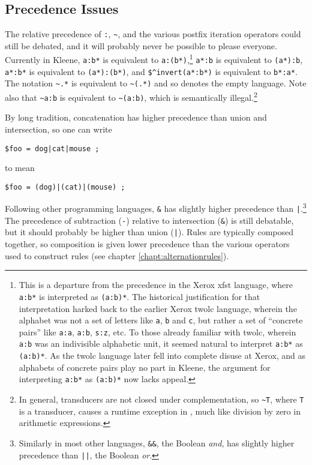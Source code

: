 \subsection{Precedence Issues}
 
The relative precedence of  \verb!:!, \verb!~!, and the various postfix
iteration operators could still be debated, and it will probably never be
possible to please everyone.
Currently in Kleene, 
\verb!a:b*!  is equivalent to \verb!a:(b*)!,\footnote{This is a
departure from the precedence in the Xerox xfst language, where
\verb!a:b*! is interpreted as \verb!(a:b)*!.  The historical
justification for that interpretation harked back to the earlier Xerox twolc
language, wherein the alphabet was not a set of letters like \verb!a!,
\verb!b! and \verb!c!, but rather a set of ``concrete pairs'' like
\verb!a:a!, \verb!a:b!, \verb!s:z!, etc. To those already familiar with
twolc, wherein \verb!a:b! was an indivisible alphabetic unit, it seemed
natural to interpret \verb!a:b*! as \verb!(a:b)*!. As the twolc language
later fell into complete disuse at Xerox, and as alphabets of concrete
pairs play no part in Kleene, the argument for interpreting
\verb!a:b*! as \verb!(a:b)*! now lacks appeal.}
\verb!a*:b!  is equivalent to \verb!(a*):b!,
\verb!a*:b*! is equivalent to \verb!(a*):(b*)!,
and
\verb!$^invert(a*:b*)! is equivalent to \verb!b*:a*!.
The notation \verb!~.*! is
equivalent to \verb!~(.*)! and so denotes the empty language.
Note also that \verb!~a:b! is
equivalent to \verb!~(a:b)!, which is semantically illegal.\footnote{In
	general, transducers are not closed under complementation, so
	\texttt{\~{}T}, where \texttt{T} is a transducer, causes a runtime
exception in \Kleene{}, much like division by zero in arithmetic
expressions.}

By long tradition, concatenation has higher precedence
than union and intersection, so one can write  

\begin{Verbatim}
$foo = dog|cat|mouse ; 
\end{Verbatim}

\noindent
to mean

\begin{Verbatim}
$foo = (dog)|(cat)|(mouse) ;
\end{Verbatim}

\noindent
Following other programming languages, \verb!&! has slightly higher
precedence than \verb!|!.\footnote{Similarly in most other languages,
\texttt{\&\&}, the Boolean \emph{and},
has slightly higher precedence than \texttt{||}, the Boolean \emph{or}.}
The precedence of subtraction (\verb!-!) relative to intersection
(\verb!&!) is still debatable, but it should probably be higher than
union (\verb!|!).
Rules are typically composed together, so composition is given lower precedence
than the various operators used to construct rules (see chapter
\ref{chapt:alternationrules}).  

